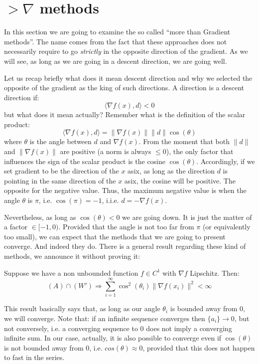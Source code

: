 \section{$> \nabla$ methods}
\par In this section we are going to examine the so called ``more than Gradient methods''. The name comes from the fact that these approaches does not necessarily require to go \textit{strictly} in the opposite direction of the gradient. As we will see, as long as we are going in a descent direction, we are going well.
\par Let us recap briefly what does it mean descent direction and why we selected the opposite of the gradient as the king of such directions. A direction is a descent direction if:
\begin{equation}
    \langle \nabla f(x), d \rangle < 0
\end{equation}
but what does it mean actually? Remember what is the definition of the scalar product:
\begin{equation}
    \langle \nabla f(x), d \rangle = \lVert \nabla f(x) \rVert \lVert d \rVert \cos (\theta)
\end{equation}
where $\theta$ is the angle between $d$ and $\nabla f(x)$. From the moment that both $\lVert d \rVert$ and $\lVert \nabla f(x) \rVert$ are positive (a norm is always $\leq 0$), the only factor that influences the sign of the scalar product is the cosine $\cos(\theta)$. Accordingly, if we set gradient to be the direction of the $x$ asix, as long as the direction $d$ is pointing in the same direction of the $x$ asix, the cosine will be positive. The opposite for the negative value. Thus, the maximum negative value is when the angle $\theta$ is $\pi$, i.e. $\cos(\pi) = -1$, i.i.e. $d = - \nabla f(x)$.
\par Nevertheless, as long as $\cos(\theta) < 0$ we are going down. It is just the matter of a factor $\in [-1,0)$. Provided that the angle is not too far from $\pi$ (or equivalently too small), we can expect that the methods that we are going to present converge. And indeed they do. There is a general result regarding these kind of methods, we announce it without proving it:
\begin{theorem}
    Suppose we have a non unbounded function $f \in C^1$ with $\nabla f$ Lipschitz. Then:
    \[
        (A) \cap (W') \Rightarrow \sum_{i=1}^{\infty} \cos^2(\theta_i) \lVert \nabla f(x_i) \rVert^2 < \infty
    \]
\end{theorem}
This result basically says that, as long as our angle $\theta_i$ is bounded away from 0, we will converge. Note that: if an infinite sequence converges then $\{a_i\} \rightarrow 0$, but not conversely, i.e. a converging sequence to 0 does not imply a converging infinite sum. In our case, actually, it is also possible to converge even if $\cos(\theta)$ is not bounded away from 0, i.e. $cos(\theta) \approx 0$, provided that this does not happen to fast in the series.
%
%
%
